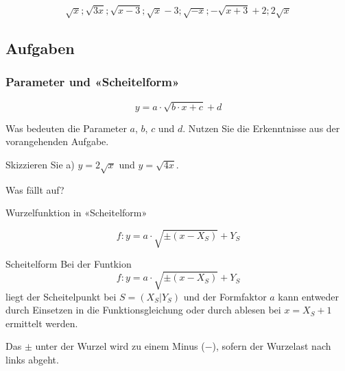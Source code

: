 $$\sqrt{x}; \sqrt{3x}; \sqrt{x-3}; \sqrt{x} - 3;
\sqrt{-x}; -\sqrt{x+3} + 2; 2\sqrt{x}$$

\subsection*{Aufgaben}


\newpage


\subsubsection{Parameter und «Scheitelform»}
$$y = a\cdot{} \sqrt{b\cdot{}x + c} + d$$

Was bedeuten die Parameter $a$, $b$, $c$ und $d$. Nutzen Sie die
Erkenntnisse aus der vorangehenden Aufgabe.


Skizzieren Sie a) $y=2\sqrt{x}$ und $y=\sqrt{4x}$.

Was fällt auf?



\begin{definition}{Wurzelfunktion in «Scheitelform»}{}

  $$f: y = a\cdot{}\sqrt{\pm(x-X_S)} + Y_S$$

\end{definition}

\begin{gesetz}{Scheitelform}{}
  Bei der Funtkion
  $$f: y = a\cdot{}\sqrt{\pm(x-X_S)} + Y_S$$
liegt der Scheitelpunkt bei $S=(X_S | Y_S)$ und der Formfaktor $a$ kann
entweder durch Einsetzen in die Funktionsgleichung oder durch ablesen
bei $x=X_S+1$ ermittelt werden.

Das $\pm$ unter der Wurzel wird zu einem Minus ($-$), sofern der
Wurzelast nach links abgeht.
\end{gesetz}

